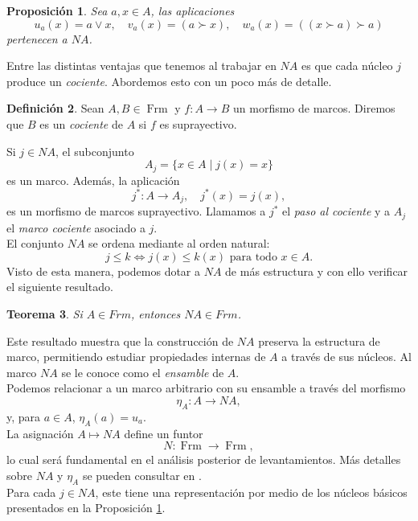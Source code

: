 \documentclass[11pt]{amsart}
\DeclareMathOperator{\Frm}{Frm}
\theoremstyle{plain}
\newtheorem{thm}{Teorema}[section]
\newtheorem{prop}[thm]{Proposición}
\theoremstyle{definition}
\newtheorem{dfn}[thm]{Definición}
\begin{document}
\begin{prop}\label{ejnucleos}
Sea $a, x\in A$, las aplicaciones 
\[
u_a(x)=a\vee x,\quad v_a(x)=(a\succ x), \quad w_a(x)=((x\succ a)\succ a)
\]
pertenecen a $NA$.
\end{prop}

Entre las distintas ventajas que tenemos al trabajar en $NA$ es que cada núcleo $j$ produce un \emph{cociente}. Abordemos esto con un poco más de detalle.

\begin{dfn}\label{cociente}
Sean $A, B\in \Frm$ y $f\colon A\to B$ un morfismo de marcos. Diremos que $B$ es un \emph{cociente} de $A$ si $f$ es suprayectivo.
\end{dfn}

Si $j\in NA$, el subconjunto
\[
A_j=\{x\in A\mid j(x)=x\}
\]
es un marco. Además, la aplicación
\[
j^*\colon A\to A_j, \quad j^*(x)=j(x),
\]  
es un morfismo de marcos suprayectivo. Llamamos a $j^*$ el \emph{paso al cociente} y a $A_j$ el \emph{marco cociente} asociado a $j$.\\

El conjunto $NA$ se ordena mediante al orden natural:
\[
j\leq k \iff j(x)\leq k(x)\text{ para todo }x\in A.
\]
Visto de esta manera, podemos dotar a $NA$ de más estructura y con ello verificar el siguiente resultado.

\begin{thm}\label{Ensamble}
Si $A\in Frm$, entonces $NA\in Frm$.
\end{thm}

Este resultado muestra que la construcción de $NA$ preserva la estructura de marco, permitiendo estudiar propiedades internas de $A$ a través 
de sus núcleos. Al marco $NA$ se le conoce como el \emph{ensamble} de $A$.\\ 

Podemos relacionar a un marco arbitrario con su ensamble a través 
del morfismo
\[
\eta_A\colon A\to NA,
\]
y, para $a\in A$, $\eta_A(a)=u_a$.\\

La asignación $A\mapsto NA$ define un funtor
\[
N\colon \Frm\to \Frm,
\]
lo cual será fundamental en el análisis posterior de levantamientos. Más detalles sobre $NA$ y $\eta_A$ se pueden consultar en 
\cite{simmons2006assembly,simmonsbasics,simmonscollection,Zaldivar2023}.\\

Para cada $j\in NA$, este tiene una representación por medio de los núcleos básicos
presentados en la Proposición \ref{ejnucleos}.
\end{document}

